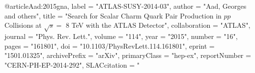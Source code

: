 

@article{Aad:2015gna,
      label          = "ATLAS-SUSY-2014-03",
      author         = "Aad, Georges and others",
      title          = "{Search for Scalar Charm Quark Pair Production in $pp$
                        Collisions at $\sqrt{s}=$ 8  TeV with the ATLAS
                        Detector}",
      collaboration  = "ATLAS",
      journal        = "Phys. Rev. Lett.",
      volume         = "114",
      year           = "2015",
      number         = "16",
      pages          = "161801",
      doi            = "10.1103/PhysRevLett.114.161801",
      eprint         = "1501.01325",
      archivePrefix  = "arXiv",
      primaryClass   = "hep-ex",
      reportNumber   = "CERN-PH-EP-2014-292",
      SLACcitation   = "%
}

